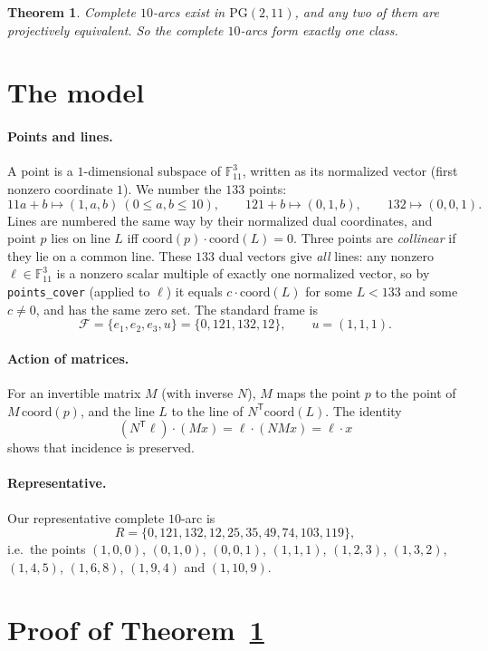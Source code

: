 \documentclass[11pt]{article}
\newtheorem{theorem}{Theorem}
\theoremstyle{definition}
\theoremstyle{remark}
\newcommand{\F}{\mathbb{F}_{11}}
\newcommand{\PG}{\mathrm{PG}(2,11)}
\begin{document}
\begin{theorem}\label{thm:main}
Complete $10$-arcs exist in $\PG$, and any two of them are projectively
equivalent. So the complete $10$-arcs form exactly one class.
\end{theorem}

\section{The model}\label{sec:model}
\paragraph{Points and lines.}
A point is a $1$-dimensional subspace of $\F^3$, written as its normalized
vector (first nonzero coordinate $1$). We number the $133$ points:
\[
11a+b\mapsto(1,a,b)\ (0\le a,b\le10),\qquad 121+b\mapsto(0,1,b),\qquad
132\mapsto(0,0,1).
\]
Lines are numbered the same way by their normalized dual coordinates, and point
$p$ lies on line $L$ iff $\mathrm{coord}(p)\cdot\mathrm{coord}(L)=0$. Three
points are \emph{collinear} if they lie on a common line. These $133$ dual vectors give \emph{all} lines: any nonzero $\ell\in\F^3$ is a nonzero scalar multiple of exactly one normalized vector, so by \texttt{points\_cover} (applied to $\ell$) it equals $c\cdot\mathrm{coord}(L)$ for some $L<133$ and some $c\neq0$, and has the same zero set. The standard frame is
\[
\mathcal F=\{e_1,e_2,e_3,u\}=\{0,121,132,12\},\qquad u=(1,1,1).
\]

\paragraph{Action of matrices.}
For an invertible matrix $M$ (with inverse $N$), $M$ maps the point $p$ to the
point of $M\,\mathrm{coord}(p)$, and the line $L$ to the line of
$N^{\mathsf T}\mathrm{coord}(L)$. The identity
\[
(N^{\mathsf T}\ell)\cdot(Mx)=\ell\cdot(NMx)=\ell\cdot x
\]
shows that incidence is preserved.

\paragraph{Representative.} Our representative complete $10$-arc is
\[
R=\{0,121,132,12,25,35,49,74,103,119\},
\]
i.e.\ the points $(1,0,0)$, $(0,1,0)$, $(0,0,1)$, $(1,1,1)$, $(1,2,3)$,
$(1,3,2)$, $(1,4,5)$, $(1,6,8)$, $(1,9,4)$ and $(1,10,9)$.

\section{Proof of Theorem~\ref{thm:main}}
\end{document}
